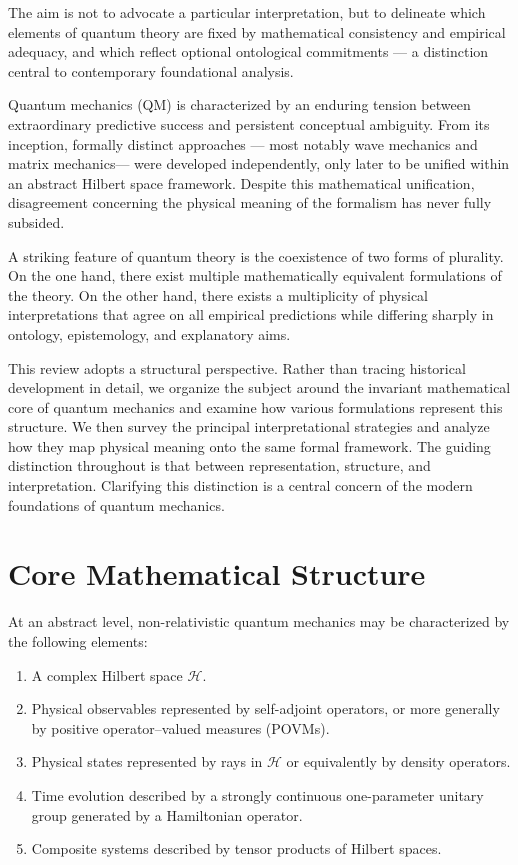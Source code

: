 The aim is not to advocate a particular interpretation, but to delineate which 
elements of quantum theory are fixed by mathematical consistency and empirical 
adequacy, and which reflect optional ontological commitments --- a distinction 
central to contemporary foundational analysis.

Quantum mechanics (QM) is characterized by an enduring tension between 
extraordinary predictive success and persistent conceptual ambiguity. 
From its inception, formally distinct approaches --- most notably wave 
mechanics and matrix mechanics--- were developed independently, 
only later to be unified within an abstract Hilbert space framework. 
Despite this mathematical unification, disagreement concerning the physical 
meaning of the formalism has never fully subsided.

A striking feature of quantum theory is the coexistence of two forms of plurality. 
On the one hand, there exist multiple mathematically equivalent formulations of the theory.
On the other hand, there exists a multiplicity of physical interpretations 
that agree on all empirical predictions while differing sharply in ontology,
epistemology, and explanatory aims.

This review adopts a structural perspective. Rather than tracing historical 
development in detail, we organize the subject around the invariant mathematical
core of quantum mechanics and examine how various formulations represent this structure.
We then survey the principal interpretational strategies and analyze how 
they map physical meaning onto the same formal framework. The guiding distinction 
throughout is that between representation, structure, and interpretation.
Clarifying this distinction is a central concern of the modern foundations of quantum mechanics.

\section{Core Mathematical Structure}

At an abstract level, non-relativistic quantum mechanics may be characterized by the following elements:

\begin{enumerate}
\item A complex Hilbert space $\mathcal{H}$.
\item Physical observables represented by self-adjoint operators,
    or more generally by positive operator--valued measures (POVMs).
\item Physical states represented by rays in $\mathcal{H}$ or 
    equivalently by density operators.
\item Time evolution described by a strongly continuous one-parameter 
    unitary group generated by a Hamiltonian operator.
\item Composite systems described by tensor products of Hilbert spaces.
\end{enumerate}

